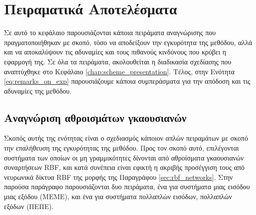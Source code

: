 \chapter{Πειραματικά Αποτελέσματα}
\label{chap:experiments}
Σε αυτό το κεφάλαιο παρουσιάζονται κάποια πειράματα αναγνώρισης που πραγματοποιήθηκαν με σκοπό, τόσο να αποδείξουν την εγκυρότητα της μεθόδου, αλλά και να αποκαλύψουν τις αδυναμίες και τους πιθανούς κινδύνους που κρύβει η εφαρμογή της. Σε όλα τα πειράματα, ακολουθείται η διαδικασία σχεδίασης που αναπτύχθηκε στο Κεφάλαιο \ref{chap:scheme_presentation}. Τέλος, στην Ενότητα \ref{eq:remarks_on_exp} παρουσιάζουμε κάποια συμπεράσματα για την απόδοση και τις αδυναμίες της μεθόδου.



\section{Αναγνώριση αθροισμάτων γκαουσιανών}
\label{sec:rbf_experiments}
Σκοπός αυτής της ενότητας είναι ο σχεδιασμός κάποιον απλών πειραμάτων με σκοπό την επαλήθευση της εγκυρότητας της μεθόδου. Προς τον σκοπό αυτό, επιλέγονται συστήματα των οποίων οι μη γραμμικότητες δίνονται από αθροίσματα γκαουσιανών συναρτήσεων RBF, και κατά συνέπεια είναι εφικτή η ακριβής προσέγγιση τους από νευρωνικά δίκτυα RBF της μορφής της Παραγράφου \ref{sec:rbf_networks}. Στην παρούσα παράγραφο παρουσιάζονται δυο πειράματα, ένα για συστήματα μιας εισόδου μιας εξόδου (ΜΕΜΕ), και ένα για συστήματα πολλαπλών εισόδων, πολλαπλών εξόδων (ΠΕΠΕ).
